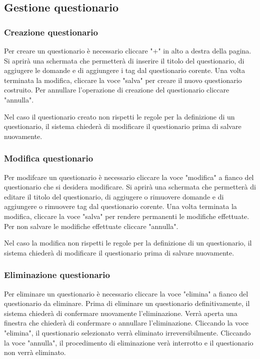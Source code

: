 \documentclass[12pt,a4paper]{article}
\begin{document}
	\subsection{Gestione questionario}
		\subsubsection{Creazione questionario}
			Per creare un questionario è necessario cliccare "+" in alto a destra della pagina. Si aprirà una schermata che permetterà di inserire il titolo del questionario, di aggiugere le domande e di aggiungere i tag dal questionario corente.
			Una volta terminata la modifica, cliccare la voce "salva" per creare il nuovo questionario costruito. 
			Per annullare l'operazione di creazione del questionario cliccare "annulla".
			
			Nel caso il questionario creato non rispetti le regole per la definizione di un questionario, il sistema chiederà di modificare il questionario prima di salvare nuovamente.
		\subsubsection{Modifica questionario}
			Per modifcare un questionario è necessario cliccare la voce "modifica" a fianco del questionario che si desidera modificare. Si aprirà una schermata che permetterà di editare il titolo del questionario, di aggiugere o rimuovere domande e di aggiungere o rimuovere tag dal questionario corente.
			Una volta terminata la modifica, cliccare la voce "salva" per rendere permanenti le modifiche effettuate. Per non salvare le modifiche effettuate cliccare "annulla".
			
			Nel caso la modifica non rispetti le regole per la definizione di un questionario, il sistema chiederà di modificare il questionario prima di salvare nuovamente.
			
		\subsubsection{Eliminazione questionario}
		Per eliminare un questionario è necessario cliccare la voce "elimina" a fianco del questionario da eliminare. Prima di eliminare un questionario definitivamente, il sistema chiederà di confermare nuovamente l'eliminazione.
		Verrà aperta una finestra che chiederà di confermare o annullare l'eliminazione. Cliccando la voce "elimina", il questionario selezionato verrà eliminato irreversibilmente. Cliccando la voce "annulla", il procedimento di eliminazione verà interrotto e il questionario non verrà eliminato.
\end{document}
